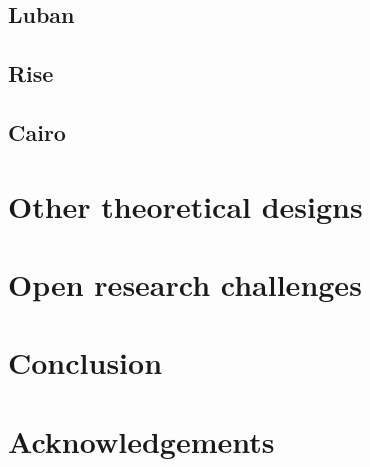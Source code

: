 \documentclass[conference]{IEEEtran}
\theoremstyle{boldstyle}
\begin{document}
        \subsection{ \textbf{Luban}}
        
        \subsection{ \textbf{Rise}}
        
        \subsection{ \textbf{Cairo}}
        
        
                

\section{Other theoretical designs}

\section{Open research challenges} %


\section{Conclusion}

\section*{Acknowledgements}





\newpage

% 


\end{document}

